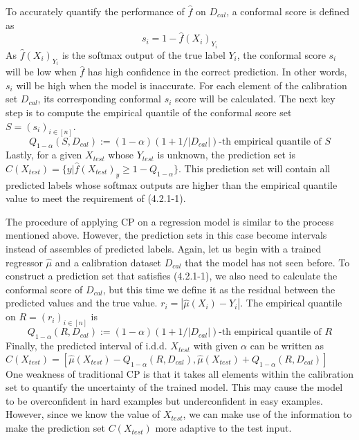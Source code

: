 To accurately quantify the performance of $\hat{f}$ on $D_{cal}$, a conformal score is defined as 
\begin{equation} 
s_i = 1-\hat{f}(X_i)_{Y_i}\tag{4.2.1-2}
\end{equation}
As $\hat{f}(X_i)_{Y_i}$ is the softmax output of the true label $Y_i$, the conformal score $s_i$ will be low when $\hat{f}$ has high confidence in the correct prediction. In other words, $s_i$ will be high when the model is inaccurate. For each element of the calibration set $D_{cal}$, its corresponding conformal $s_i$ score will be calculated. The next key step is to compute the empirical quantile of the conformal score set $S = (s_i)_{i\in[n]}$.
 \begin{equation} 
Q_{1-\alpha}(S,D_{cal}):=(1-\alpha)(1+1/|D_{cal}|)\text{-th empirical quantile of }S \tag{4.2.1-3}
 \end{equation} 
Lastly, for a given $X_{test}$ whose $Y_{test}$ is unknown, the prediction set is $C(X_{test})=\{y|\hat{f}(X_{test})_y\ge 1-Q_{1-\alpha}\}$.  This prediction set will contain all predicted labels whose softmax outputs are higher than the empirical quantile value to meet the requirement of (4.2.1-1).

The procedure of applying CP on a regression model is similar to the process mentioned above. However, the prediction sets in this case become intervals instead of assembles of predicted labels. Again, let us begin with a trained regressor $\hat{\mu}$ and a calibration dataset $D_{cal}$ that the model has not seen before.  To construct a prediction set that satisfies (4.2.1-1), we also need to calculate the conformal score of $D_{cal}$, but this time we define it as the residual between the predicted values and the true value.
$r_i = |\hat{\mu}(X_i)-Y_i|$.  The empirical quantile on $R = (r_i)_{i\in[n]}$ is
 \begin{equation} 
Q_{1-\alpha}(R,D_{cal}):=(1-\alpha)(1+1/|D_{cal}|)\text{-th empirical quantile of }R \tag{4.2.1-5}
 \end{equation} 
Finally, the predicted interval of i.d.d. $X_{test}$ with given $\alpha$ can be written as $C(X_{test})=[\hat{\mu}(X_{test})-Q_{1-\alpha}(R,D_{cal}),\hat{\mu}(X_{test})+Q_{1-\alpha}(R,D_{cal})]$\\

One weakness of traditional CP is that it takes all elements within the calibration set to quantify the uncertainty of the trained model. This may cause the model to be overconfident in hard examples but underconfident in easy examples.  However, since we know the value of $X_{test}$, we can make use of the information to make the prediction set $C(X_{test})$ more adaptive to the test input. 

